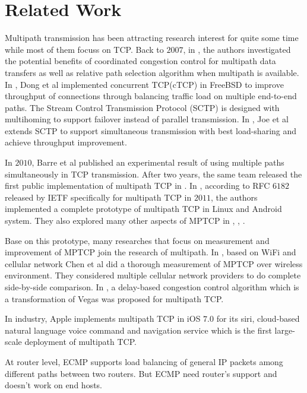 \section{Related Work}
\label{sec:related}
Multipath transmission has been attracting research interest for quite some time while most of them focuss on TCP. Back to $2007$, in \cite{key01}, the authors investigated the potential benefits of coordinated congestion control for multipath data transfers as well as relative path selection algorithm when multipath is available. In \cite{dong01}, Dong et al implemented concurrent TCP(cTCP) in FreeBSD  to improve throughput of connections through balancing traffic load on multiple end-to-end paths. The Stream Control Transmission Protocol (SCTP)\cite{sctp} is designed with multihoming to support failover instead of parallel transmission. In \cite{joe01}, Joe et al extends SCTP to support simultaneous transmission with best load-sharing and achieve throughput improvement.

In $2010$, Barre et al published an experimental result of using multiple paths simultaneously in TCP transmission. After two years, the same team released the first public implementation of multipath TCP in \cite{mptcp}. In \cite{mptcp}, according to RFC $6182$ released by IETF specifically for multipath TCP in $2011$, the authors implemented a complete prototype of multipath TCP in Linux and Android system. They also explored many other aspects of MPTCP in \cite{PDDRB12}, \cite{DPLMAB13}, \cite{PKB13}.

Base on this prototype, many researches that focus on measurement and improvement of MPTCP join the research of multipath. In \cite{chen01}, based on WiFi and cellular network Chen et al did a thorough measurement of MPTCP over wireless environment. They considered multiple cellular network providers to do complete side-by-side comparison. In \cite{cao01}, a delay-based congestion control algorithm which is a transformation of Vegas\cite{vegas} was proposed for multipath TCP.

In industry, Apple\cite{apple} implements multipath TCP in iOS $7.0$ for its siri, cloud-based natural language voice command and navigation service which is the first large-scale deployment of multipath TCP. 

At router level, ECMP\cite{ecmp} supports load balancing of general IP packets among different paths between two routers. But ECMP need router's support and doesn't work on end hosts. 